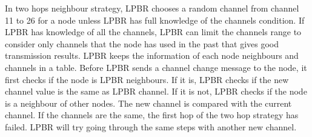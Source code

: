 In two hops neighbour strategy, LPBR chooses a random channel from channel 11 to 26 for a node unless LPBR has full knowledge of the channels condition. If LPBR has knowledge of all the channels, LPBR can limit the channels range to consider only channels that the node has used in the past that gives good transmission results. LPBR keeps the information of each node neighbours and channels in a table. Before LPBR sends a channel change message to the node, it first checks if the node is LPBR neighbours. If it is, LPBR checks if the new channel value is the same as LPBR channel. If it is not, LPBR checks if the node is a neighbour of other nodes. The new channel is compared with the current channel. If the channels are the same, the first hop of the two hop strategy has failed. LPBR will try going through the same steps with another new channel.

